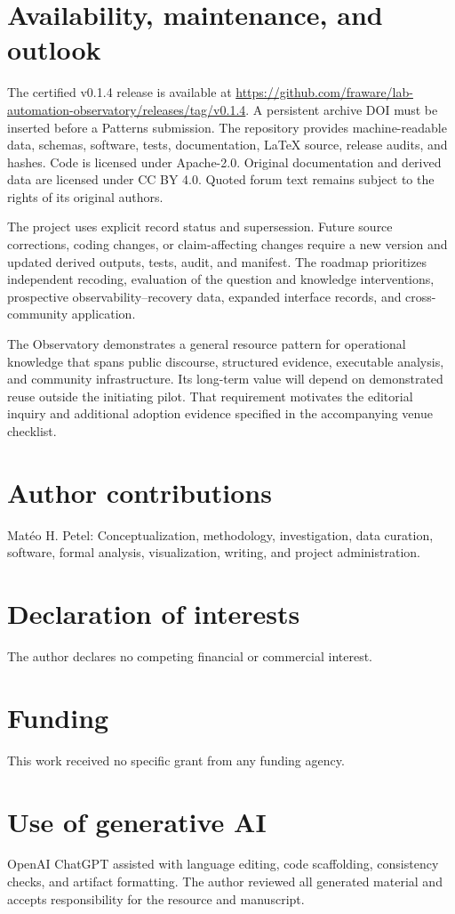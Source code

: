 \section{Availability, maintenance, and outlook}

The certified v0.1.4 release is available at \url{https://github.com/fraware/lab-automation-observatory/releases/tag/v0.1.4}. A persistent archive DOI must be inserted before a Patterns submission. The repository provides machine-readable data, schemas, software, tests, documentation, LaTeX source, release audits, and hashes. Code is licensed under Apache-2.0. Original documentation and derived data are licensed under CC BY 4.0. Quoted forum text remains subject to the rights of its original authors.

The project uses explicit record status and supersession. Future source corrections, coding changes, or claim-affecting changes require a new version and updated derived outputs, tests, audit, and manifest. The roadmap prioritizes independent recoding, evaluation of the question and knowledge interventions, prospective observability--recovery data, expanded interface records, and cross-community application.

The Observatory demonstrates a general resource pattern for operational knowledge that spans public discourse, structured evidence, executable analysis, and community infrastructure. Its long-term value will depend on demonstrated reuse outside the initiating pilot. That requirement motivates the editorial inquiry and additional adoption evidence specified in the accompanying venue checklist.

\section*{Author contributions}
Mat\'eo H. Petel: Conceptualization, methodology, investigation, data curation, software, formal analysis, visualization, writing, and project administration.

\section*{Declaration of interests}
The author declares no competing financial or commercial interest.

\section*{Funding}
This work received no specific grant from any funding agency.

\section*{Use of generative AI}
OpenAI ChatGPT assisted with language editing, code scaffolding, consistency checks, and artifact formatting. The author reviewed all generated material and accepts responsibility for the resource and manuscript.
